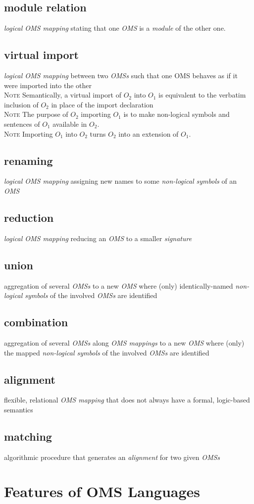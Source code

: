 \documentclass[10pt,%
\ifpretendfinal
final%
\else
draft%
\fi,
]{scrreprt}
\newcommand*{\termref}[1]{\textit{#1}}
\newcommand{\sclause}[1]{\section{#1}}
\newcommand{\termdefinition}[2]{\subsection*{#1}#2}
\newenvironment{definitions}[0]{\medskip }{}
\newenvironment{note}[0]{\ \\ \textsc{Note} \quad}{}
\begin{document}
\begin{definitions}
  \termdefinition{module relation}{\termref{logical OMS mapping} stating that one \termref{OMS} is a \termref{module} of the other one.}

  \termdefinition{virtual import}{\termref{logical OMS mapping} between two
    \termref{OMSs} such that one OMS behaves as if it were
    imported into the other}
  \begin{note}
Semantically, a virtual import of $O_2$ into $O_1$ is equivalent to the verbatim inclusion of $O_2$ in place of the import declaration
  \end{note}
  \begin{note}
    The purpose of $O_2$ importing $O_1$ is to make non-logical symbols and sentences of $O_1$ available in $O_2$.
  \end{note}
  \begin{note}
    Importing $O_1$ into $O_2$ turns $O_2$ into an extension of $O_1$.
  \end{note}
  
  \termdefinition{renaming}{\termref{logical OMS mapping} assigning new names
   to some \termref{non-logical symbols} of an \termref{OMS}}

  \termdefinition{reduction}{\termref{logical OMS mapping} reducing an \termref{OMS} to a smaller \termref{signature}}

  \termdefinition{union}{aggregation of several \termref{OMSs}
    to a new \termref{OMS} where (only) identically-named
    \termref{non-logical symbols} of the involved \termref{OMSs} are identified}

  \termdefinition{combination}{aggregation of several \termref{OMSs} along \termref{OMS mappings} to a new \termref{OMS} where (only) the mapped
  \termref{non-logical symbols} of the involved \termref{OMSs} are identified}

  \termdefinition{alignment}{flexible, relational \termref{OMS mapping} that does not always have a formal, logic-based semantics}

  \termdefinition{matching}{algorithmic procedure that generates an \termref{alignment} for two given \termref{OMSs}}
\end{definitions}

\sclause{Features of OMS Languages}
 
\end{document}
